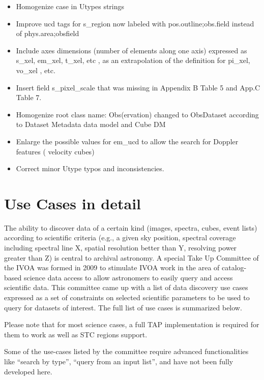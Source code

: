 \documentclass[11pt,a4paper]{ivoa}
\begin{document}
\begin{itemize}
\item Homogenize case in Utypes strings
\item Improve ucd tags for s\_region now labeled with pos.outline;obs.field instead of phys.area;obsfield
\item Include axes dimensions (number of elements along one axis) expressed as s\_xel, em\_xel, t\_xel, etc , as an
extrapolation of the definition for pi\_xel, vo\_xel , etc.
\item Insert field s\_pixel\_scale that was missing in Appendix B Table 5 and App.C Table 7.
\item Homogenize root class name: Obs(ervation) changed to ObsDataset according to Dataset Metadata data model and Cube
DM
\item Enlarge the possible values for em\_ucd to allow the search for Doppler features ( velocity cubes)
\item Correct minor Utype typos and inconsistencies.
\end{itemize}



\appendix

\section{Use Cases in detail}
The ability to discover data of a certain kind (images, spectra, cubes, event lists) according to scientific criteria
(e.g., a given sky position, spectral coverage including spectral line X, spatial resolution better than Y, resolving
power greater than Z) is central to archival astronomy. A special Take Up Committee of the IVOA was formed in 2009 to
stimulate IVOA work in the area of catalog-based science data access to allow astronomers to easily query and access
scientific data.  This committee came up with a list of data discovery use cases expressed as a set of constraints on
selected scientific parameters to be used to query for datasets of interest. The full list of use cases is summarized
below.

Please note that for most science cases, a full TAP implementation is required for them to work as well as STC regions
support. \citep{2009ivoa.rept.1030R}

Some of the use-cases listed by the committee require advanced functionalities like ``search by type'', ``query from an
input list'', and have not been fully developed here.
\end{document}
